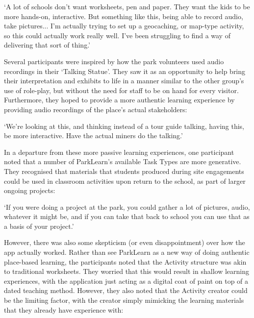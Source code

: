 \begin{displayquote}
`A lot of schools don't want worksheets, pen and paper. They want the kids to be more hands-on, interactive. But something like this, being able to record audio, take pictures... I'm actually trying to set up a geocaching, or map-type activity, so this could actually work really well. I've been struggling to find a way of delivering that sort of thing.'
\end{displayquote}

Several participants were inspired by how the park volunteers used audio recordings in their `Talking Statue'. They saw it as an opportunity to help bring their interpretation and exhibits to life in a manner similar to the other group's use of role-play, but without the need for staff to be on hand for every visitor. Furthermore, they hoped to provide a more authentic learning experience by providing audio recordings of the place's actual stakeholders:

\begin{displayquote}
`We're looking at this, and thinking instead of a tour guide talking, having this, be more interactive. Have the actual miners do the talking.'
\end{displayquote}

In a departure from these more passive learning experiences, one participant noted that a number of ParkLearn's available Task Types are more generative. They recognised that materials that students produced during site engagements could be used in classroom activities upon return to the school, as part of larger ongoing projects:

\begin{displayquote}
`If you were doing a project at the park, you could gather a lot of pictures, audio, whatever it might be, and if you can take that back to school you can use that as a basis of your project.'
\end{displayquote}

However, there was also some skepticism (or even disappointment) over how the app actually worked. Rather than see ParkLearn as a new way of doing authentic place-based learning, the participants noted that the Activity structure was akin to traditional worksheets. They worried that this would result in shallow learning experiences, with the application just acting as a digital coat of paint on top of a dated teaching method. However, they also noted that the Activity creator could be the limiting factor, with the creator simply mimicking the learning materials that they already have experience with:

